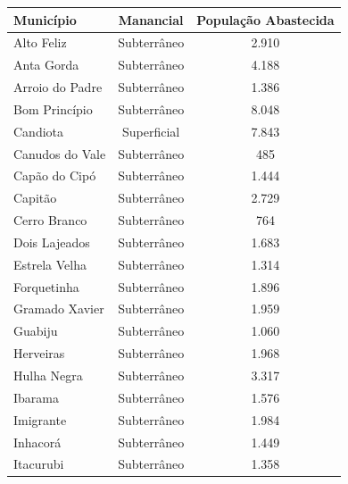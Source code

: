 \begin{apendicesenv}
\begin{table}[!htb]
\centering
\footnotesize
\label{tab:com_esp}
    \begin{tabular}{lcc}
    \toprule
    \textbf{Município} & \textbf{Manancial} & \textbf{População Abastecida} \\ \hline
      Alto Feliz              & Subterrâneo        & 2.910                         \\
Anta Gorda              & Subterrâneo        & 4.188                         \\
Arroio do Padre         & Subterrâneo        & 1.386                         \\
Bom Princípio           & Subterrâneo        & 8.048                         \\
Candiota                & Superficial        & 7.843                         \\
Canudos do Vale         & Subterrâneo        & 485                           \\
Capão do Cipó           & Subterrâneo        & 1.444                         \\
Capitão                 & Subterrâneo        & 2.729                         \\
Cerro Branco            & Subterrâneo        & 764                           \\
Dois Lajeados           & Subterrâneo        & 1.683                         \\
Estrela Velha           & Subterrâneo        & 1.314                         \\
Forquetinha             & Subterrâneo        & 1.896                         \\
Gramado Xavier          & Subterrâneo        & 1.959                         \\
Guabiju                 & Subterrâneo        & 1.060                         \\
Herveiras               & Subterrâneo        & 1.968                         \\
Hulha Negra             & Subterrâneo        & 3.317                         \\
Ibarama                 & Subterrâneo        & 1.576                         \\
Imigrante               & Subterrâneo        & 1.984                         \\
Inhacorá                & Subterrâneo        & 1.449                         \\
Itacurubi               & Subterrâneo        & 1.358                         \\

\end{tabular}
\end{table}
\end{apendicesenv}
